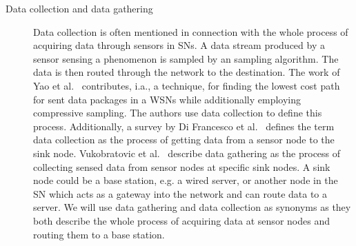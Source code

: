 \begin{description}
    \item[Data collection and data gathering] 
        Data collection is often mentioned in connection with the whole process
        of acquiring data through sensors in \acp{SN}. A data stream produced
        by a sensor sensing a phenomenon is sampled by an sampling algorithm.
        The data is then routed through the network to the destination. The
        work of Yao et al.~\cite{yao2015edal} contributes, i.a., a technique,
        for finding the lowest cost path for sent data packages in a \acp{WSN}
        while additionally employing compressive sampling. The authors use data
        collection to define this process. Additionally, a survey by Di
        Francesco et al.~\cite{di2011data} defines the term data collection as
        the process of getting data from a sensor node to the sink node.
        Vukobratovic et al.~\cite{vukobratovic2010rateless} describe data
        gathering as the process of collecting sensed data from sensor nodes at
        specific sink nodes. A sink node could be a base station, e.g. a wired
        server, or another node in the \ac{SN} which acts as a gateway into the
        network and can route data to a server. We will use data gathering and
        data collection as synonyms as they both describe the whole process of
        acquiring data at sensor nodes and routing them to a base station.


\end{description}
